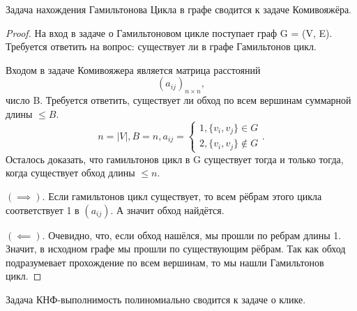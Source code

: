\begin{theorem}
Задача нахождения Гамильтонова Цикла в графе сводится к задаче Комивояжёра.
\end{theorem}
\begin{proof}
На вход в задаче о Гамильтоновом цикле поступает граф G = (V, E). Требуется
ответить на вопрос: существует ли в графе Гамильтонов цикл. 

Входом в задаче Комивояжера является матрица расстояний \[\left( a_{ij}
\right)_{n\times n}
,\] число B. Требуется ответить, существует ли обход по всем вершинам суммарной
длины $\le B$.
\[
n=|V|, B = n, a_{ij} = \begin{cases}
	
	1, \{v_i, v_j\} \in G\\
	2,  \{v_i, v_j\} \notin G
\end{cases}
.\]
Осталось доказать, что гамильтонов цикл в G существует тогда и только тогда,
когда существует обход длины $\le n$. 

$\left( \implies \right) $. Если гамильтонов цикл существует, то всем рёбрам
этого цикла соответствует 1 в $\left( a_{ij} \right) $. А значит обход найдётся. 

$\left( \impliedby \right) $. Очевидно, что, если обход нашёлся, мы прошли по
ребрам длины 1. Значит, в исходном графе мы прошли по существующим рёбрам. Так
как обход подразумевает прохождение по всем вершинам, то мы нашли Гамильтонов
цикл.
\end{proof}
\begin{theorem}
Задача КНФ-выполнимость полиномиально сводится к задаче о клике.
\end{theorem}
